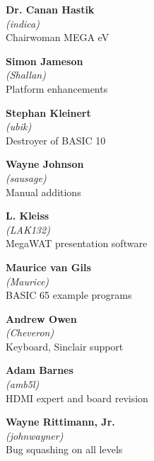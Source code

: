 \begin{mega65thanks}
\columnbreak

\begin{minipage}{\linewidth}
  {\large\bf Dr. Canan Hastik} \\
  \textit{(indica)} \\
  Chairwoman MEGA eV
\end{minipage}

\begin{minipage}{\linewidth}
  {\large\bf Simon Jameson} \\
  \textit{(Shallan)} \\
  Platform enhancements
\end{minipage}

\begin{minipage}{\linewidth}
  {\large\bf Stephan Kleinert} \\
  \textit{(ubik)} \\
  Destroyer of BASIC 10
\end{minipage}

\begin{minipage}{\linewidth}
  {\large\bf Wayne Johnson} \\
  \textit{(sausage)} \\
  Manual additions
\end{minipage}

\begin{minipage}{\linewidth}
  {\large\bf L. Kleiss} \\
  \textit{(LAK132)} \\
  MegaWAT presentation software
\end{minipage}

\begin{minipage}{\linewidth}
  {\large\bf Maurice van Gils }  \\
  \textit{(Maurice)}  \\
  BASIC 65 example programs
\end{minipage}

\begin{minipage}{\linewidth}
  {\large\bf Andrew Owen}  \\
  \textit{(Cheveron)} \\
  Keyboard, Sinclair support
\end{minipage}

\begin{minipage}{\linewidth}
  {\large\bf Adam Barnes}  \\
  \textit{(amb5l)} \\
  HDMI expert and board revision
\end{minipage}

\begin{minipage}{\linewidth}
  {\large\bf Wayne Rittimann, Jr.} \\
  \textit{(johnwayner)} \\
  Bug squashing on all levels
\end{minipage}

\end{mega65thanks}


